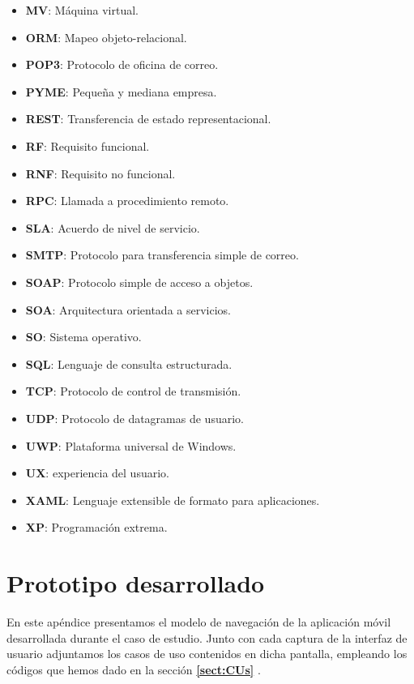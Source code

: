 \documentclass[11pt,spanish,listoffigures]{tfgetsinf}
\begin{document}
\begin{itemize}
\item \textbf{MV}: Máquina virtual.
\item \textbf{ORM}: Mapeo objeto-relacional.
\item \textbf{POP3}: Protocolo de oficina de correo.
\item \textbf{PYME}: Pequeña y mediana empresa.
\item \textbf{REST}: Transferencia de estado representacional.
\item \textbf{RF}: Requisito funcional.
\item \textbf{RNF}: Requisito no funcional.
\item \textbf{RPC}: Llamada a procedimiento remoto.
\item \textbf{SLA}: Acuerdo de nivel de servicio.
\item \textbf{SMTP}: Protocolo para transferencia simple de correo.
\item \textbf{SOAP}: Protocolo simple de acceso a objetos.
\item \textbf{SOA}: Arquitectura orientada a servicios.
\item \textbf{SO}: Sistema operativo.
\item \textbf{SQL}: Lenguaje de consulta estructurada.
\item \textbf{TCP}: Protocolo de control de transmisión.
\item \textbf{UDP}: Protocolo de datagramas de usuario.
\item \textbf{UWP}: Plataforma universal de Windows.
\item \textbf{UX}: experiencia del usuario.
\item \textbf{XAML}: Lenguaje extensible de formato para aplicaciones.
\item \textbf{XP}: Programación extrema.

\end{itemize}

%

\chapter{Prototipo desarrollado} \label{ch:ModeloNavegacion}

En este apéndice presentamos el modelo de navegación de la aplicación móvil desarrollada durante el caso de estudio. Junto con cada captura de la interfaz de usuario adjuntamos los casos de uso contenidos en dicha pantalla, empleando los códigos que hemos dado en la sección \textbf{\ref{sect:CUs} }.
\end{document}

